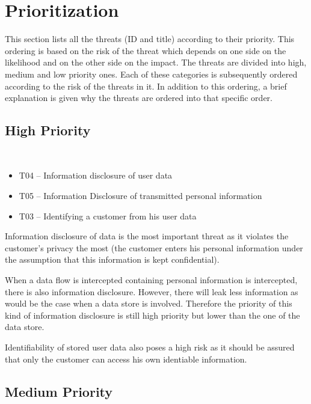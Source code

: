 \section{Prioritization}
\label{sec:prioritization}

\npar This section lists all the threats (ID and title) according to their
priority. This ordering is based on the risk of the threat which depends on one
side on the likelihood and on the other side on the impact. The threats are
divided into high, medium and low priority ones. Each of these categories is
subsequently ordered according to the risk of the threats in it. In addition to
this ordering, a brief explanation is given why the threats are ordered into
that specific order.

\subsection{High Priority}

\ %

\begin{itemize}
  \item T04 -- Information disclosure of user data
  \item T05 -- Information Disclosure of transmitted personal information
  \item T03 -- Identifying a customer from his user data  
\end{itemize}

\npar Information disclosure of data is the most important threat as it violates
the customer's privacy the most (the customer enters his personal information
under the assumption that this information is kept confidential).

\npar When a data flow is intercepted containing personal information is
intercepted, there is also information disclosure. However, there will leak less
information as would be the case when a data store is involved. Therefore the
priority of this kind of information disclosure is still high priority but lower
than the one of the data store.

\npar Identifiability of stored user data also poses a high risk as it should be
assured that only the customer can access his own identiable information.

\subsection{Medium Priority}

\ %

